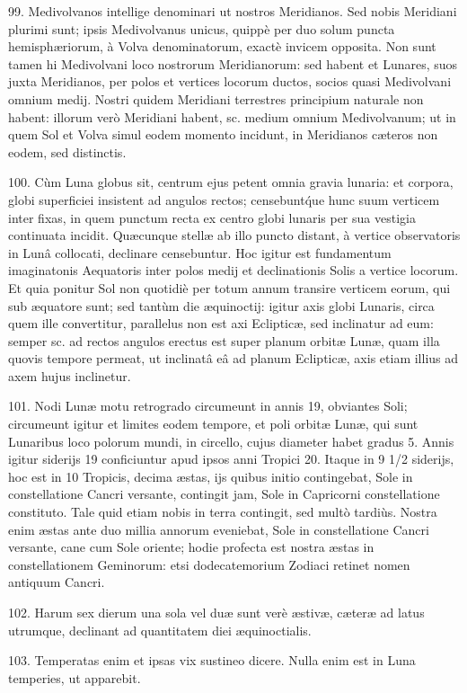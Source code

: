 \documentclass[a4paper, 11pt, oneside, polutonikogreek, german]{article}
\begin{document}
99. Medivolvanos intellige denominari ut nostros Meridianos. Sed nobis Meridiani plurimi sunt; ipsis Medivolvanus unicus, quippè per duo solum puncta hemisphæriorum, à Volva denominatorum, exactè invicem opposita. Non sunt tamen hi Medivolvani loco nostrorum Meridianorum: sed habent et Lunares, suos juxta Meridianos, per polos et vertices locorum ductos, socios quasi Medivolvani omnium medij. Nostri quidem Meridiani terrestres principium naturale non habent: illorum verò Meridiani habent, sc. medium omnium Medivolvanum; ut in quem Sol et Volva simul eodem momento incidunt, in Meridianos cæteros non eodem, sed distinctis.

100. Cùm Luna globus sit, centrum ejus petent omnia gravia lunaria: et corpora, globi superficiei insistent ad angulos rectos; censebunt\'que hunc suum verticem inter fixas, in quem punctum recta ex centro globi lunaris per sua vestigia continuata incidit. Quæcunque stellæ ab illo puncto distant, à vertice observatoris in Lunâ collocati, declinare censebuntur. Hoc igitur est fundamentum imaginatonis Aequatoris inter polos medij et declinationis Solis a vertice locorum. Et quia ponitur Sol non quotidiè per totum annum transire verticem eorum, qui sub æquatore sunt; sed tantùm die æquinoctij: igitur axis globi Lunaris, circa quem ille convertitur, parallelus non est axi Eclipticæ, sed inclinatur ad eum: semper sc. ad rectos angulos erectus est super planum orbitæ Lunæ, quam illa quovis tempore permeat, ut inclinatâ eâ ad planum Eclipticæ, axis etiam illius ad axem hujus inclinetur.

101. Nodi Lunæ motu retrogrado circumeunt in annis 19, obviantes Soli; circumeunt igitur et limites eodem tempore, et poli orbitæ Lunæ, qui sunt Lunaribus loco polorum mundi, in circello, cujus diameter habet gradus 5. Annis igitur siderijs 19 conficiuntur apud ipsos anni Tropici 20. Itaque in 9 1/2 siderijs, hoc est in 10 Tropicis, decima æstas, ijs quibus initio contingebat, Sole in constellatione Cancri versante, contingit jam, Sole in Capricorni constellatione constituto. Tale quid etiam nobis in terra contingit, sed multò tardiùs. Nostra enim æstas ante duo millia annorum eveniebat, Sole in constellatione Cancri versante, cane cum Sole oriente; hodie profecta est nostra æstas in constellationem Geminorum: etsi dodecatemorium Zodiaci retinet nomen antiquum Cancri.

102. Harum sex dierum una sola vel duæ sunt verè æstivæ, cæteræ ad latus utrumque, declinant ad quantitatem diei æquinoctialis.

103. Temperatas enim et ipsas vix sustineo dicere. Nulla enim est in Luna temperies, ut apparebit.
\end{document}
